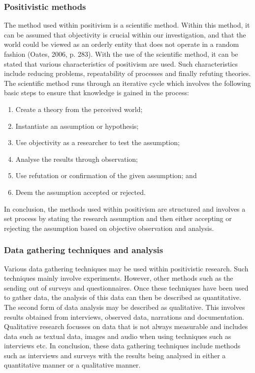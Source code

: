 \subsubsection{Positivistic methods}
The method used within positivism is a scientific method. Within this method, it can be assumed that objectivity is crucial within our investigation, and that the world could be viewed as an orderly entity that does not operate in a random fashion (Oates, 2006, p. 283). 
With the use of the scientific method, it can be stated that various characteristics of positivism are used. Such characteristics include reducing problems, repeatability of processes and finally refuting theories. 
The scientific method runs through an iterative cycle which involves the following basic steps to ensure that knowledge is gained in the process:
\begin{enumerate}
	\item Create a theory from the perceived world;
	\item Instantiate an assumption or hypothesis;
	\item Use objectivity as a researcher to test the assumption;
	\item Analyse the results through observation;
	\item Use refutation or confirmation of the given assumption; and
	\item Deem the assumption accepted or rejected.
\end{enumerate}

In conclusion, the methods used within positivism are structured and involves a set process by stating the research assumption and then either accepting or rejecting the assumption based on objective observation and analysis.

\subsubsection{Data gathering techniques and analysis}
Various data gathering techniques may be used within positivistic research. Such techniques mainly involve experiments. However, other methods such as the sending out of surveys and questionnaires. Once these techniques have been used to gather data, the analysis of this data can then be described as quantitative. The second form of data analysis may be described as qualitative. This involves results obtained from interviews, observed data, narrations and documentation. Qualitative research focusses on data that is not always measurable and includes data such as textual data, images and audio when using techniques such as interviews etc. 
In conclusion, these data gathering techniques include methods such as interviews and surveys with the results being analysed in either a quantitative manner or a qualitative manner.
